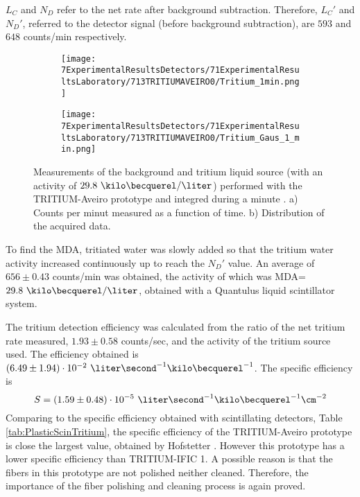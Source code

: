 $L_C$ and $N_D$ refer to the net rate after background subtraction. Therefore, $L_C'$ and $N_D'$, referred to the detector signal (before background subtraction), are $593$ and $648$ counts/min respectively.

\begin{figure}
\centering
    \begin{subfigure}[b]{0.45\textwidth}
    \centering
    \texttt{[image: 7ExperimentalResultsDetectors/71ExperimentalResultsLaboratory/713TRITIUMAVEIRO0/Tritium\_1min.png]}  
    \caption{\label{subfig:MeasurementInRealTime}}
    \end{subfigure}
    \hfill
    \begin{subfigure}[b]{0.45\textwidth}
    \centering
    \texttt{[image: 7ExperimentalResultsDetectors/71ExperimentalResultsLaboratory/713TRITIUMAVEIRO0/Tritium\_Gaus\_1\_min.png]}  
    \caption{\label{subfig:DistributionofMeasurement}}
    \end{subfigure}
 \caption{Measurements of the background and tritium liquid source (with an activity of $29.8~\kilo\becquerel/\liter$) performed with the TRITIUM-Aveiro prototype and integred during a minute \cite{ExperimentalPaperCarlos}. a) Counts per minut measured as a function of time. b) Distribution of the acquired data.}
 \label{fig:BackgroundTritium1min}
\end{figure}

To find the MDA, tritiated water was slowly added  so that the tritium water activity increased continuously up to reach the $N_D'$ value. An average of $656 \pm 0.43$ counts/min was obtained, the activity of which was MDA=$29.8~\kilo\becquerel/\liter$, obtained with a Quantulus liquid scintillator system.

The tritium detection efficiency was calculated from the ratio of the net tritium rate measured, $1.93 \pm 0.58$ counts/sec, and the activity of the tritium source used. The efficiency obtained is $(6.49 \pm 1.94)\cdot{} 10^{-2}~\liter\second^{-1}\kilo\becquerel^{-1}$.  The specific efficiency is
$$S=(1.59 \pm 0.48)\cdot{} 10^{-5}~\liter\second^{-1}\kilo\becquerel^{-1}\cm^{-2}$$ 
Comparing to the specific efficiency obtained with scintillating detectors, Table \ref{tab:PlasticScinTritium}, the specific efficiency of the TRITIUM-Aveiro prototype is close the largest value, obtained by Hofstetter \cite{Hofstetter1, Hofstetter2}. However this prototype has a lower specific efficiency than TRITIUM-IFIC 1. A possible reason is that the fibers in this prototype are not polished neither cleaned. Therefore, the importance of the fiber polishing and cleaning process is again proved.


